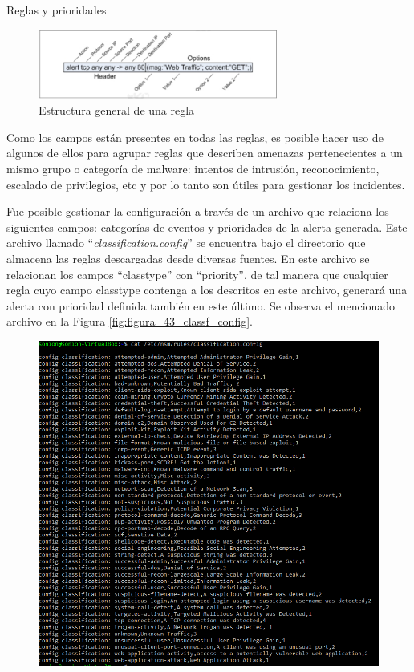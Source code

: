 \begin{section}{Reglas y prioridades}
    \begin{figure}[H]
    \centering        \includegraphics[width=0.7\textwidth]{./iteracion_3_imagenes/figura_41_estructura_regla.png}
    \caption{Estructura general de una regla}
    \label{fig:figura_41_estruc_regla}
    \end{figure}
    \FloatBarrier
    Como los campos están presentes en todas las reglas, es posible hacer uso de algunos de ellos para agrupar reglas que describen amenazas pertenecientes a un mismo grupo o categoría de malware: intentos de intrusión, reconocimiento, escalado de privilegios, etc y por lo tanto son útiles para gestionar los incidentes. \par
    Fue posible gestionar la configuración a través de un archivo que relaciona los siguientes campos: categorías de eventos y prioridades de la alerta generada. Este archivo llamado “\textit{classification.config}” se encuentra bajo el directorio que almacena las reglas descargadas desde diversas fuentes. En este archivo se relacionan los campos “classtype” con “priority”, de tal manera que cualquier regla cuyo campo classtype contenga a los descritos en este archivo, generará una alerta con prioridad definida también en este último. Se observa el mencionado archivo en la Figura \ref{fig:figura_43_classf_config}.
    \begin{figure}[H]
    \centering        \includegraphics[width=1\textwidth]{./iteracion_3_imagenes/classification-config.png}

\end{figure}
\end{section}
